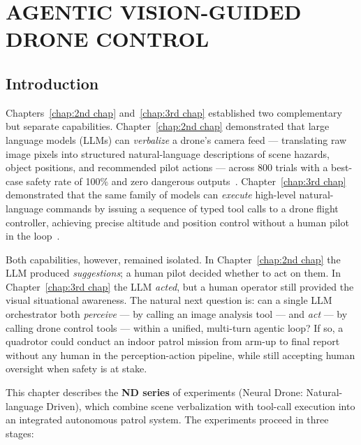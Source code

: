 \chapter{AGENTIC VISION-GUIDED DRONE CONTROL}
\label{chap:4th chap}

\section{Introduction}
\label{sec:ch4_intro}

Chapters~\ref{chap:2nd chap} and~\ref{chap:3rd chap} established two complementary but
separate capabilities.  Chapter~\ref{chap:2nd chap} demonstrated that large language models
(LLMs) can \emph{verbalize} a drone's camera feed --- translating raw image pixels into
structured natural-language descriptions of scene hazards, object positions, and recommended
pilot actions --- across 800 trials with a best-case safety rate of 100\% and zero dangerous
outputs~\cite{vemprala2023chatgpt}.  Chapter~\ref{chap:3rd chap} demonstrated that the same
family of models can \emph{execute} high-level natural-language commands by issuing a
sequence of typed tool calls to a drone flight controller, achieving precise altitude and
position control without a human pilot in the loop~\cite{yao2022react}.

Both capabilities, however, remained isolated.  In Chapter~\ref{chap:2nd chap} the LLM
produced \emph{suggestions}; a human pilot decided whether to act on them.  In
Chapter~\ref{chap:3rd chap} the LLM \emph{acted}, but a human operator still provided the
visual situational awareness.  The natural next question is: can a single LLM orchestrator
both \emph{perceive} --- by calling an image analysis tool --- and \emph{act} --- by calling
drone control tools --- within a unified, multi-turn agentic loop?  If so, a quadrotor could
conduct an indoor patrol mission from arm-up to final report without any human in the
perception-action pipeline, while still accepting human oversight when safety is at stake.

This chapter describes the \textbf{ND series} of experiments (Neural Drone: Natural-language
Driven), which combine scene verbalization with tool-call execution into an integrated
autonomous patrol system.  The experiments proceed in three stages:


